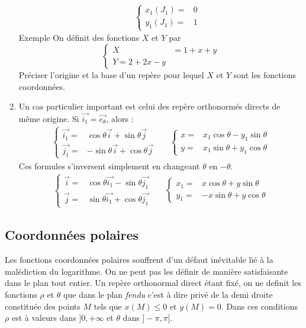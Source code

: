 \begin{enumerate}
\begin{align*}
& & 
 \left\lbrace 
\begin{aligned}
 x_1(J_1)=& 0\\
 y_1(J_1)=& 1
\end{aligned}
\right. 
\end{align*}
Exemple On définit des fonctions $X$ et $Y$ par
\begin{displaymath}
 \left\lbrace 
\begin{aligned}
 X &= 1+x+y \\ Y = 2+2x-y
\end{aligned}
\right. 
\end{displaymath}
Préciser l'origine et la base d'un repère pour lequel $X$ et $Y$ sont les fonctions coordonnées.
\item Un cas particulier important est celui des repère orthonormés directs de même origine. Si $\overrightarrow{i_1}=\overrightarrow{e_\theta}$, alors :
\begin{align*}
 \left\lbrace 
\begin{aligned}
 \overrightarrow{i_1} =& \cos \theta  \overrightarrow{i} + \sin \theta  \overrightarrow{j} \\ 
\overrightarrow{j_1} =& -\sin \theta  \overrightarrow{i} + \cos \theta  \overrightarrow{j}
\end{aligned}
\right.
& &
 \left\lbrace 
\begin{aligned}
 x =& x_1\cos \theta   - y_1\sin \theta \\ 
 y =& x_1\sin \theta   + y_1\cos \theta 
\end{aligned}
\right.
\end{align*}
Ces formules s'inversent simplement en changeant $\theta$ en $-\theta$.
\begin{align*}
 \left\lbrace 
\begin{aligned}
 \overrightarrow{i} =& \cos \theta  \overrightarrow{i_1} - \sin \theta  \overrightarrow{j_1} \\ 
\overrightarrow{j} =& \sin \theta  \overrightarrow{i_1} + \cos \theta  \overrightarrow{j_1}
\end{aligned}
\right.
& &
 \left\lbrace 
\begin{aligned}
 x_1 =& x\cos \theta   + y\sin \theta \\ 
 y_1 =& -x\sin \theta   + y\cos \theta 
\end{aligned}
\right.
\end{align*}
\end{enumerate}

\subsection{Coordonnées polaires}
Les fonctions coordonnées polaires souffrent d'un défaut inévitable lié à la malédiction du logarithme. On ne peut pas les définir de manière satisfaisante dans le plan tout entier. Un repère orthonormal direct étant fixé, on ne definit les fonctions $\rho$ et $\theta$ que dans le plan \emph{fendu} c'est à dire privé de la demi droite constituée des points $M$ tels que $x(M)\leq 0$ et $y(M)=0$. Dans ces conditions $\rho$ est à valeurs dans $]0,+\infty$ et $\theta$ dans $]-\pi,\pi[$.

